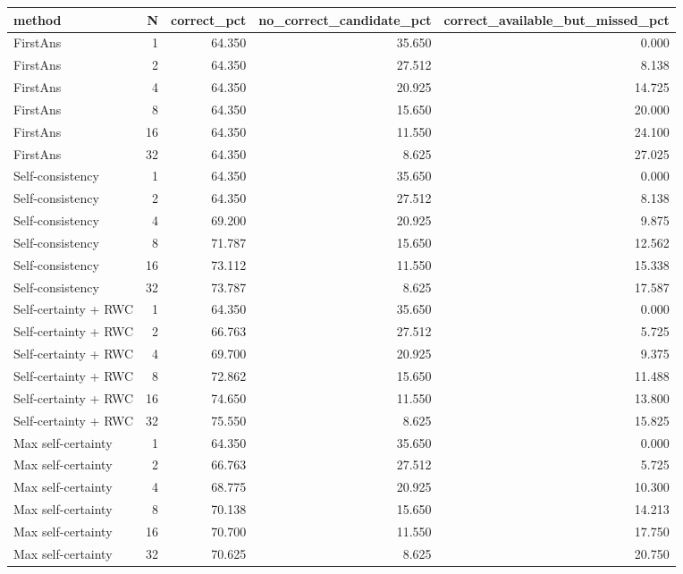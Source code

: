\begin{tabular}{lrrrr}
\toprule
method & N & correct\_pct & no\_correct\_candidate\_pct & correct\_available\_but\_missed\_pct \\
\midrule
FirstAns & 1 & 64.350 & 35.650 & 0.000 \\
FirstAns & 2 & 64.350 & 27.512 & 8.138 \\
FirstAns & 4 & 64.350 & 20.925 & 14.725 \\
FirstAns & 8 & 64.350 & 15.650 & 20.000 \\
FirstAns & 16 & 64.350 & 11.550 & 24.100 \\
FirstAns & 32 & 64.350 & 8.625 & 27.025 \\
Self-consistency & 1 & 64.350 & 35.650 & 0.000 \\
Self-consistency & 2 & 64.350 & 27.512 & 8.138 \\
Self-consistency & 4 & 69.200 & 20.925 & 9.875 \\
Self-consistency & 8 & 71.787 & 15.650 & 12.562 \\
Self-consistency & 16 & 73.112 & 11.550 & 15.338 \\
Self-consistency & 32 & 73.787 & 8.625 & 17.587 \\
Self-certainty + RWC & 1 & 64.350 & 35.650 & 0.000 \\
Self-certainty + RWC & 2 & 66.763 & 27.512 & 5.725 \\
Self-certainty + RWC & 4 & 69.700 & 20.925 & 9.375 \\
Self-certainty + RWC & 8 & 72.862 & 15.650 & 11.488 \\
Self-certainty + RWC & 16 & 74.650 & 11.550 & 13.800 \\
Self-certainty + RWC & 32 & 75.550 & 8.625 & 15.825 \\
Max self-certainty & 1 & 64.350 & 35.650 & 0.000 \\
Max self-certainty & 2 & 66.763 & 27.512 & 5.725 \\
Max self-certainty & 4 & 68.775 & 20.925 & 10.300 \\
Max self-certainty & 8 & 70.138 & 15.650 & 14.213 \\
Max self-certainty & 16 & 70.700 & 11.550 & 17.750 \\
Max self-certainty & 32 & 70.625 & 8.625 & 20.750 \\
\bottomrule
\end{tabular}
